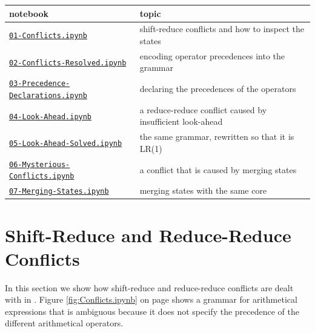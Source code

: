 \begin{center}
  \begin{tabular}[t]{|l|p{}|}
    \hline
    notebook & topic \\
    \hline
    \hline
    \href{https://github.com/karlstroetmann/Formal-Languages/blob/master/Python/Chapter-11/01-Conflicts.ipynb}{\texttt{01-Conflicts.ipynb}}            & shift-reduce conflicts and how to inspect the states \\
    \hline
    \href{https://github.com/karlstroetmann/Formal-Languages/blob/master/Python/Chapter-11/02-Conflicts-Resolved.ipynb}{\texttt{02-Conflicts-Resolved.ipynb}}   & encoding operator precedences into the grammar       \\
    \hline
    \href{https://github.com/karlstroetmann/Formal-Languages/blob/master/Python/Chapter-11/03-Precedence-Declarations.ipynb}{\texttt{03-Precedence-Declarations.ipynb}} & declaring the precedences of the operators \\
    \hline
    \href{https://github.com/karlstroetmann/Formal-Languages/blob/master/Python/Chapter-11/04-Look-Ahead.ipynb}{\texttt{04-Look-Ahead.ipynb}}           & a reduce-reduce conflict caused by insufficient look-ahead \\
    \hline
    \href{https://github.com/karlstroetmann/Formal-Languages/blob/master/Python/Chapter-11/05-Look-Ahead-Solved.ipynb}{\texttt{05-Look-Ahead-Solved.ipynb}}    & the same grammar, rewritten so that it is LR(1) \\
    \hline
    \href{https://github.com/karlstroetmann/Formal-Languages/blob/master/Python/Chapter-11/06-Mysterious-Conflicts.ipynb}{\texttt{06-Mysterious-Conflicts.ipynb}} & a conflict that is caused by merging states \\
    \hline
    \href{https://github.com/karlstroetmann/Formal-Languages/blob/master/Python/Chapter-11/07-Merging-States.ipynb}{\texttt{07-Merging-States.ipynb}} & merging states with the same core \\
    \hline
  \end{tabular}
\end{center}

\section{Shift-Reduce and Reduce-Reduce Conflicts}
In this section we show how shift-reduce and reduce-reduce conflicts are dealt with in .
Figure \ref{fig:Conflicts.ipynb} on page \pageref{fig:Conflicts.ipynb} shows a grammar for arithmetical
expressions that is ambiguous because it does not specify the precedence of the different arithmetical
operators.

